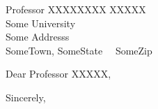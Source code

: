 \documentclass[12pt]{NUAAletter}
\date{\vspace{10mm} \today}
\makeatletter
\def\name{Your Name}
\def\Position{\vspace*{.5\baselineskip}\textbf{\color{nuaablue}Chair for Machine Learning and Data Engineering}}
\def\Title{\hspace{-1.2mm}\textbf{\color{nuaablue}Prof.~Dr.~\name}}
\def\TEL{
\vspace*{.5\baselineskip}
\textbf{Contact}\\
{\color{nuaablue}Phone}: +86-12345678987}
\def\Where{
\vspace*{.5\baselineskip}
\textbf{\color{nuaablue}
College of Electronic and Information Engineering
}}
\def\Address{29 Jiangjun Ave., Nanjing~211106, China}
\def\Email{{\color{nuaablue}e-mail}: your.name@nuaa.edu.cn}
\def\Website{{\color{nuaablue}website}: \url{your.website}}
\def\newaddress{
\Title\\
\Position\\
\TEL\\ 
\Email\\ 
\Website\\
\Where\\ 
\Address\\ 

}
\makeatother
\begin{document}
%
%
%
\begin{letter}{ 
			   Professor XXXXXXXX XXXXX\\ 
               Some University\\ 
               Some Addresss\\ 
               SomeTown, SomeState 					       				  		 ~~SomeZip
               }

%


%
\opening{Dear Professor XXXXX,}

%
\lipsum[1-5]

\closing{Sincerely,}




\end{letter}
\end{document}

